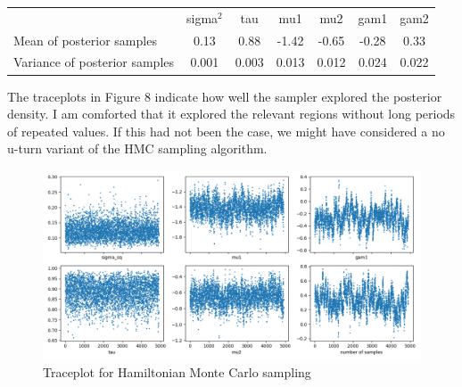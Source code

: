 \documentclass[12pt,letterpaper,twoside]{article}
\begin{document}
\begin{table}[H]
    \begin{tabular}{lcccccc}
    \multicolumn{1}{c}{}          & sigma$^2$ & tau   & mu1   & mu2   & gam1  & gam2  \\
    Mean of posterior samples     & 0.13  & 0.88  & -1.42 & -0.65 & -0.28 & 0.33  \\
    Variance of posterior samples & 0.001 & 0.003 & 0.013 & 0.012 & 0.024 & 0.022
    \end{tabular}
\end{table}

The traceplots in Figure 8 indicate how well the sampler explored the 
posterior density. I am comforted that it explored the relevant regions 
without long periods of repeated values. If this had not been the case, 
we might have considered a no u-turn variant of the HMC sampling algorithm. 
\begin{figure}[H]
    \centering
    \includegraphics[scale=0.55]{hmc_sampled_traceplot.png}
    \vspace*{-10mm}
    \caption{Traceplot for Hamiltonian Monte Carlo sampling}
\end{figure}
\end{document}
